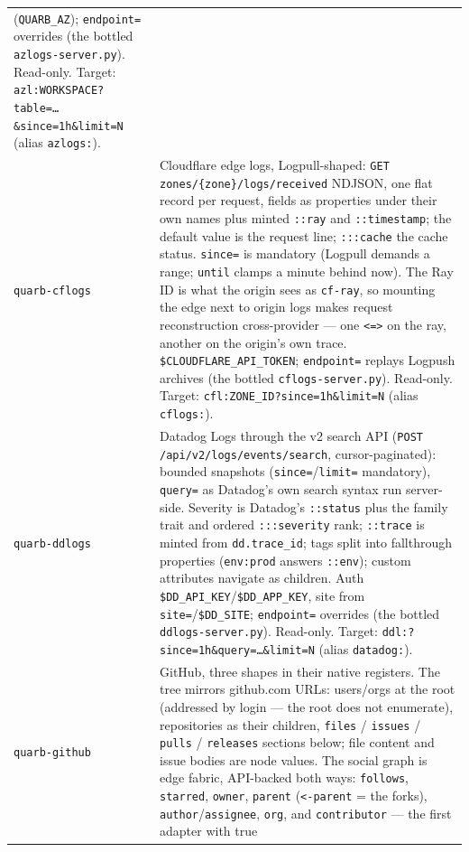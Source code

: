 \documentclass{report}
\begin{document}
\begin{xltabular}{\textwidth}{l X}
  (\texttt{QUARB\_AZ}); \texttt{endpoint=} overrides (the
  bottled \texttt{azlogs-server.py}). Read-only. Target:
  \texttt{azl:WORKSPACE?table=…\&since=1h\&limit=N} (alias
  \texttt{azlogs:}). \\
\texttt{quarb-cflogs} & Cloudflare edge logs, Logpull-shaped:
  \texttt{GET zones/\{zone\}/logs/received} NDJSON, one flat
  record per request, fields as properties under their own
  names plus minted \texttt{::ray} and \texttt{::timestamp};
  the default value is the request line; \texttt{:::cache} the
  cache status. \texttt{since=} is mandatory (Logpull demands a
  range; \texttt{until} clamps a minute behind now). The Ray ID
  is what the origin sees as \texttt{cf-ray}, so mounting the
  edge next to origin logs makes request reconstruction
  cross-provider — one \texttt{<=>} on the ray, another on the
  origin's own trace. \texttt{\$CLOUDFLARE\_API\_TOKEN};
  \texttt{endpoint=} replays Logpush archives (the bottled
  \texttt{cflogs-server.py}). Read-only. Target:
  \texttt{cfl:ZONE\_ID?since=1h\&limit=N} (alias
  \texttt{cflogs:}). \\
\texttt{quarb-ddlogs} & Datadog Logs through the v2 search API
  (\texttt{POST /api/v2/logs/events/search}, cursor-paginated):
  bounded snapshots (\texttt{since=}/\texttt{limit=} mandatory),
  \texttt{query=} as Datadog's own search syntax run
  server-side. Severity is Datadog's \texttt{::status} plus the
  family trait and ordered \texttt{:::severity} rank;
  \texttt{::trace} is minted from \texttt{dd.trace\_id}; tags
  split into fallthrough properties (\texttt{env:prod} answers
  \texttt{::env}); custom attributes navigate as children. Auth
  \texttt{\$DD\_API\_KEY}/\texttt{\$DD\_APP\_KEY}, site from
  \texttt{site=}/\texttt{\$DD\_SITE}; \texttt{endpoint=}
  overrides (the bottled \texttt{ddlogs-server.py}). Read-only.
  Target: \texttt{ddl:?since=1h\&query=…\&limit=N} (alias
  \texttt{datadog:}). \\
\texttt{quarb-github} & GitHub, three shapes in their native
  registers. The tree mirrors github.com URLs: users/orgs at
  the root (addressed by login — the root does not enumerate),
  repositories as their children, \texttt{files} /
  \texttt{issues} / \texttt{pulls} / \texttt{releases} sections
  below; file content and issue bodies are node values. The
  social graph is edge fabric, API-backed both ways:
  \texttt{follows}, \texttt{starred}, \texttt{owner},
  \texttt{parent} (\texttt{<-parent} = the forks),
  \texttt{author}/\texttt{assignee}, \texttt{org}, and
  \texttt{contributor} — the first adapter with true

\end{xltabular}
\end{document}
